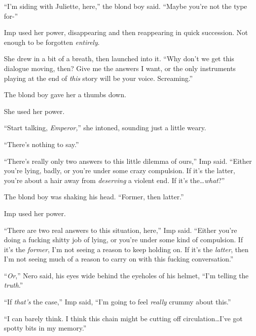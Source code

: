 ``I'm siding with Juliette, here,'' the blond boy said.  ``Maybe you're not the type for-''



Imp used her power, disappearing and then reappearing in quick succession.  Not enough to be forgotten \emph{entirely}.



She drew in a bit of a breath, then launched into it.  ``Why don't we get this dialogue moving, then?  Give me the answers I want, or the only instruments playing at the end of \emph{this} story will be your voice.  Screaming.''



The blond boy gave her a thumbs down.



She used her power.



``Start talking, \emph{Emperor,}'' she intoned, sounding just a little weary.



``There's nothing to say.''



``There's really only two answers to this little dilemma of ours,'' Imp said.  ``Either you're lying, badly, or you're under some crazy compulsion.  If it's the latter, you're about a hair away from \emph{deserving} a violent end.  If it's the\ldots \emph{what}?''



The blond boy was shaking his head.  ``Former, then latter.''



Imp used her power.



``There are two real answers to this situation, here,'' Imp said.  ``Either you're doing a fucking shitty job of lying, or you're under some kind of compulsion.  If it's the \emph{former}, I'm not seeing a reason to keep holding on.  If it's the \emph{latter}, then I'm not seeing much of a reason to carry on with this fucking conversation.''



``\emph{Or},'' Nero said, his eyes wide behind the eyeholes of his helmet, ``I'm telling the \emph{truth}.''



``If \emph{that's} the case,'' Imp said, ``I'm going to feel \emph{really} crummy about this.''



``I can barely think.  I think this chain might be cutting off circulation\ldots I've got spotty bits in my memory.''



